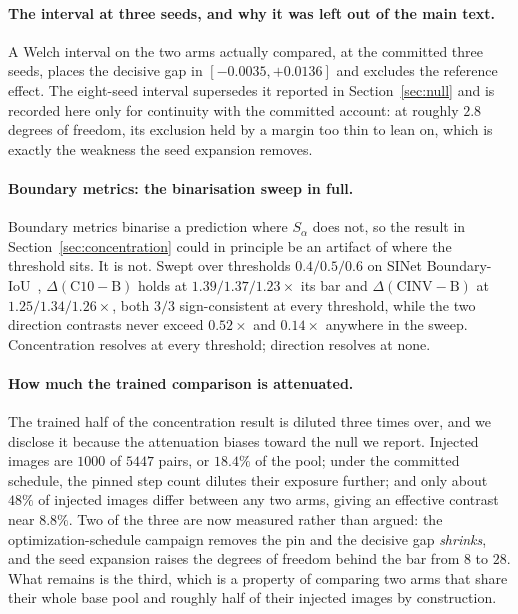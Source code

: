 \documentclass{article}
\begin{document}


\paragraph{The interval at three seeds, and why it was left out of the main text.} A Welch interval on the two
arms actually compared, at the committed three seeds, places the decisive gap in
$[-0.0035, +0.0136]$ and excludes the reference effect. The eight-seed interval supersedes it
reported in Section~\ref{sec:null} and is recorded here only for continuity with the committed
account: at roughly $2.8$ degrees of freedom, its exclusion held by a margin too thin to lean on,
which is exactly the weakness the seed expansion removes.

\paragraph{Boundary metrics: the binarisation sweep in full.} Boundary metrics binarise a
prediction where $S_\alpha$ does not, so the result in Section~\ref{sec:concentration} could in principle be an artifact of where the threshold sits. It is not. Swept over thresholds
$0.4 / 0.5 / 0.6$ on SINet Boundary-IoU~\citep{cheng2021boundary}, $\Delta(\mathrm{C10}-\mathrm{B})$ holds at
$1.39 / 1.37 / 1.23 \times$ its bar and $\Delta(\mathrm{CINV}-\mathrm{B})$ at
$1.25 / 1.34 / 1.26 \times$, both $3/3$ sign-consistent at every threshold, while the two direction
contrasts never exceed $0.52\times$ and $0.14\times$ anywhere in the sweep. Concentration resolves
at every threshold; direction resolves at none.

\paragraph{How much the trained comparison is attenuated.} The trained half of the concentration
result is diluted three times over, and we disclose it because the attenuation biases toward the
null we report. Injected images are $1000$ of $5447$ pairs, or $18.4\%$ of the pool; under the
committed schedule, the pinned step count dilutes their exposure further; and only about $48\%$ of
injected images differ between any two arms, giving an effective contrast near $8.8\%$. Two of the
three are now measured rather than argued: the optimization-schedule campaign removes the pin and
the decisive gap \emph{shrinks}, and the seed expansion raises the degrees of freedom behind the
bar from $8$ to $28$. What remains is the third, which is a property of comparing two arms that
share their whole base pool and roughly half of their injected images by construction.
\end{document}

